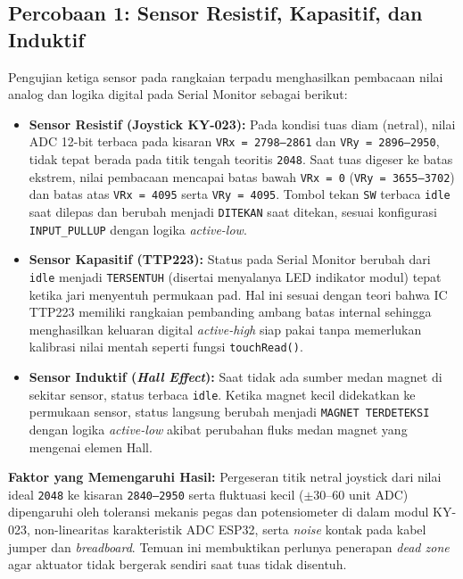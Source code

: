 \subsection{Percobaan 1: Sensor Resistif, Kapasitif, dan Induktif}
Pengujian ketiga sensor pada rangkaian terpadu menghasilkan pembacaan nilai analog dan logika digital pada Serial Monitor sebagai berikut:
\begin{itemize}
    \item \textbf{Sensor Resistif (Joystick KY-023):} Pada kondisi tuas diam (netral), nilai ADC 12-bit terbaca pada kisaran \texttt{VRx = 2798--2861} dan \texttt{VRy = 2896--2950}, tidak tepat berada pada titik tengah teoritis \texttt{2048}. Saat tuas digeser ke batas ekstrem, nilai pembacaan mencapai batas bawah \texttt{VRx = 0} (\texttt{VRy = 3655--3702}) dan batas atas \texttt{VRx = 4095} serta \texttt{VRy = 4095}. Tombol tekan \texttt{SW} terbaca \texttt{idle} saat dilepas dan berubah menjadi \texttt{DITEKAN} saat ditekan, sesuai konfigurasi \texttt{INPUT\_PULLUP} dengan logika \textit{active-low}.
    \item \textbf{Sensor Kapasitif (TTP223):} Status pada Serial Monitor berubah dari \texttt{idle} menjadi \texttt{TERSENTUH} (disertai menyalanya LED indikator modul) tepat ketika jari menyentuh permukaan pad. Hal ini sesuai dengan teori bahwa IC TTP223 memiliki rangkaian pembanding ambang batas internal sehingga menghasilkan keluaran digital \textit{active-high} siap pakai tanpa memerlukan kalibrasi nilai mentah seperti fungsi \texttt{touchRead()}.
    \item \textbf{Sensor Induktif (\textit{Hall Effect}):} Saat tidak ada sumber medan magnet di sekitar sensor, status terbaca \texttt{idle}. Ketika magnet kecil didekatkan ke permukaan sensor, status langsung berubah menjadi \texttt{MAGNET TERDETEKSI} dengan logika \textit{active-low} akibat perubahan fluks medan magnet yang mengenai elemen Hall.
\end{itemize}

\textbf{Faktor yang Memengaruhi Hasil:} Pergeseran titik netral joystick dari nilai ideal \texttt{2048} ke kisaran \texttt{2840--2950} serta fluktuasi kecil ($\pm 30\text{--}60$ unit ADC) dipengaruhi oleh toleransi mekanis pegas dan potensiometer di dalam modul KY-023, non-linearitas karakteristik ADC ESP32, serta \textit{noise} kontak pada kabel jumper dan \textit{breadboard}. Temuan ini membuktikan perlunya penerapan \textit{dead zone} agar aktuator tidak bergerak sendiri saat tuas tidak disentuh.


